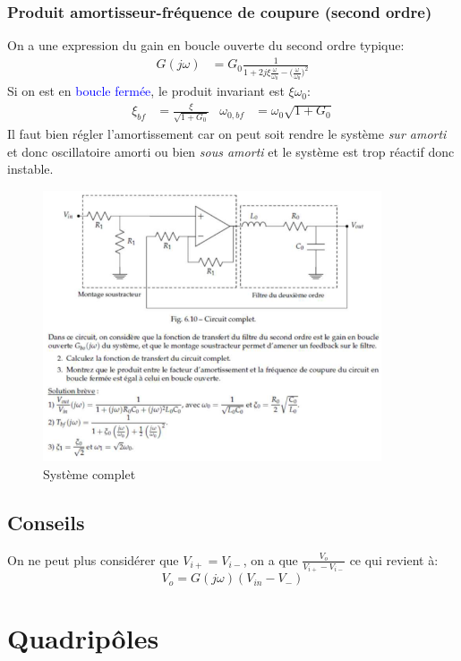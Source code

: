 \documentclass{report}
\begin{document}
\subsubsection{Produit amortisseur-fréquence de coupure (second ordre)}
On a une expression du gain en boucle ouverte du second ordre typique:
\begin{align*}
G(j \omega) &= G_0 \frac{1}{1 + 2 j \xi \frac{\omega}{\omega_0} - \Bigr( \frac{\omega}{\omega_0} \Bigr)^2}
\end{align*}
Si on est en \textcolor{blue}{boucle fermée}, le produit invariant est $\xi \omega_0$:
\begin{align*}
\xi_{bf} &= \frac{\xi}{\sqrt{1 + G_0}} & \omega_{0, bf} &= \omega_0 \sqrt{1 + G_0}
\end{align*}
Il faut bien régler l'amortissement car on peut soit rendre le système \textit{sur amorti} et donc oscillatoire amorti ou bien \textit{sous amorti} et le système est trop réactif donc instable. 
\begin{figure}[H]
\centering
\includegraphics[width=10cm]{img/amortissement.png}
\caption{Système complet}
\end{figure}

\subsection{Conseils}
On ne peut plus considérer que $V_{i+} = V_{i-}$, on a que $\frac{V_o}{V_{i+} - V_{i-}}$ ce qui revient à:
\begin{equation}
V_o = G(j \omega ) ( V_{in} - V_{-})
\end{equation}


\section{Quadripôles} \label{Quadri}
\end{document}
